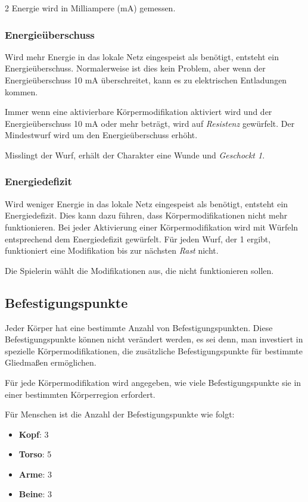 \begin{multicols}{2}
Energie wird in Milliampere (mA) gemessen.

\subsubsection{Energieüberschuss}

Wird mehr Energie in das lokale Netz eingespeist als benötigt, entsteht ein Energieüberschuss. Normalerweise ist dies kein Problem, aber wenn der Energieüberschuss 10 mA überschreitet, kann es zu elektrischen Entladungen kommen.

Immer wenn eine aktivierbare Körpermodifikation aktiviert wird und der Energieüberschuss 10 mA oder mehr beträgt, wird auf \textit{Resistenz} gewürfelt. Der Mindestwurf wird um den Energieüberschuss erhöht.

Misslingt der Wurf, erhält der Charakter eine Wunde und \textit{Geschockt 1}.

\subsubsection{Energiedefizit}

Wird weniger Energie in das lokale Netz eingespeist als benötigt, entsteht ein Energiedefizit. Dies kann dazu führen, dass Körpermodifikationen nicht mehr funktionieren. Bei jeder Aktivierung einer Körpermodifikation wird mit Würfeln entsprechend dem Energiedefizit gewürfelt. Für jeden Wurf, der 1 ergibt, funktioniert eine Modifikation bis zur nächsten \textit{Rast} nicht.

Die Spielerin wählt die Modifikationen aus, die nicht funktionieren sollen.

\subsection{Befestigungspunkte}

Jeder Körper hat eine bestimmte Anzahl von Befestigungspunkten. Diese Befestigungspunkte können nicht verändert werden, es sei denn, man investiert in spezielle Körpermodifikationen, die zusätzliche Befestigungspunkte für bestimmte Gliedmaßen ermöglichen.

Für jede Körpermodifikation wird angegeben, wie viele Befestigungspunkte sie in einer bestimmten Körperregion erfordert.

Für Menschen ist die Anzahl der Befestigungspunkte wie folgt:
\begin{itemize}
    \item \textbf{Kopf}: 3
    \item \textbf{Torso}: 5
    \item \textbf{Arme}: 3
    \item \textbf{Beine}: 3
\end{itemize}


\end{multicols}
